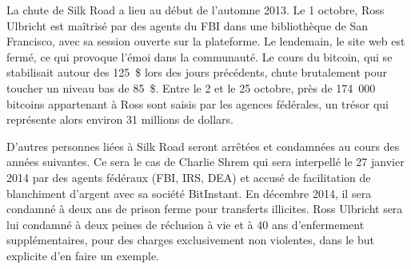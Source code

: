 La chute de Silk Road a lieu au début de l'automne 2013. Le 1\ier{} octobre, Ross Ulbricht est maîtrisé par des agents du FBI dans une bibliothèque de San Francisco, avec sa session ouverte sur la plateforme. Le lendemain, le site web est fermé, ce qui provoque l'émoi dans la communauté. Le cours du bitcoin, qui se stabilisait autour des 125~\$ lors des jours précédents, chute brutalement pour toucher un niveau bas de 85~\$. Entre le 2 et le 25 octobre, près de 174~000 bitcoins appartenant à Ross sont saisis par les agences fédérales, un trésor qui représente alors environ 31 millions de dollars.

D'autres personnes liées à Silk Road seront arrêtées et condamnées au cours des années suivantes. Ce sera le cas de Charlie Shrem qui sera interpellé le 27 janvier 2014 par des agents fédéraux (FBI, IRS, DEA) et accusé de facilitation de blanchiment d'argent avec sa société BitInstant. En décembre 2014, il sera condamné à deux ans de prison ferme pour transferts illicites. Ross Ulbricht sera lui condamné à deux peines de réclusion à vie et à 40 ans d'enfermement supplémentaires, pour des charges exclusivement non violentes, dans le but explicite d'en faire un exemple. %

